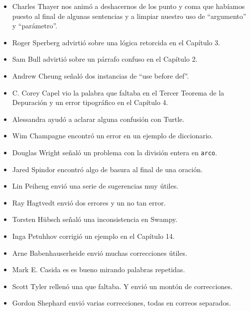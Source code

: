 \documentclass[10pt]{book}
\begin{document}
\begin{itemize}
\item Charles Thayer nos animó a deshacernos de los punto y coma que
habíamos puesto al final de algunas sentencias y a limpiar nuestro
uso de ``argumento'' y ``parámetro''.

\item Roger Sperberg advirtió sobre una lógica retorcida en el Capítulo 3.

\item Sam Bull advirtió sobre un párrafo confuso en el Capítulo 2.

\item Andrew Cheung señaló dos instancias de ``use before def''.

\item C. Corey Capel vio la palabra que faltaba en el Tercer Teorema
de la Depuración y un error tipográfico en el Capítulo 4.

\item Alessandra ayudó a aclarar alguna confusión con Turtle.

\item Wim Champagne encontró un error en un ejemplo de diccionario.

\item Douglas Wright señaló un problema con la división entera en
{\tt arco}.

\item Jared Spindor encontró algo de basura al final de una oración.

\item Lin Peiheng envió una serie de sugerencias muy útiles.

\item Ray Hagtvedt envió dos errores y un no tan error.

\item Torsten H\"{u}bsch señaló una inconsistencia en Swampy.

\item Inga Petuhhov corrigió un ejemplo en el Capítulo 14.

\item Arne Babenhauserheide envió muchas correcciones útiles.

\item Mark E. Casida es es bueno mirando palabras repetidas.

\item Scott Tyler rellenó una que faltaba.  Y envió
un montón de correcciones.

\item Gordon Shephard envió varias correcciones, todas en correos
separados.


\end{itemize}
\end{document}
